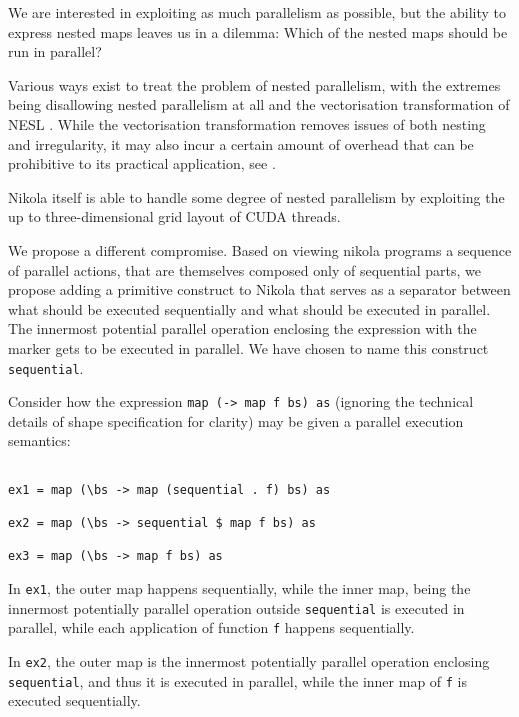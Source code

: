 \label{chap:directing-parallism}

We are interested in exploiting as much parallelism as possible, but the
ability to express nested maps leaves us in a dilemma: Which of the nested maps
should be run in parallel?

Various ways exist to treat the problem of nested parallelism, with the
extremes being disallowing nested parallelism at all and the vectorisation
transformation of NESL \cite{nesl}. While the vectorisation transformation
removes issues of both nesting and irregularity, it may also incur a certain
amount of overhead that can be prohibitive to its practical application, see
\cite{Catanzaro2011}.

Nikola itself is able to handle some degree of nested parallelism by exploiting
the up to three-dimensional grid layout of CUDA threads.

We propose a different compromise. Based on viewing nikola programs a sequence
of parallel actions, that are themselves composed only of sequential parts, we
propose adding a primitive construct to Nikola that serves as a separator
between what should be executed sequentially and what should be executed in
parallel. The innermost potential parallel operation enclosing the expression
with the marker gets to be executed in parallel. We have chosen to name this
construct \texttt{sequential}.

Consider how the expression \texttt{map (\bs -> map f bs) as} (ignoring the
technical details of shape specification for clarity) may be given a parallel
execution semantics:

\begin{verbatim}

ex1 = map (\bs -> map (sequential . f) bs) as

ex2 = map (\bs -> sequential $ map f bs) as

ex3 = map (\bs -> map f bs) as

\end{verbatim}

In \texttt{ex1}, the outer map happens sequentially, while the inner map, being
the innermost potentially parallel operation outside \texttt{sequential} is
executed in parallel, while each application of function \texttt{f} happens
sequentially.

In \texttt{ex2}, the outer map is the innermost potentially parallel operation
enclosing \texttt{sequential}, and thus it is executed in parallel, while the
inner map of \texttt{f} is executed sequentially.

